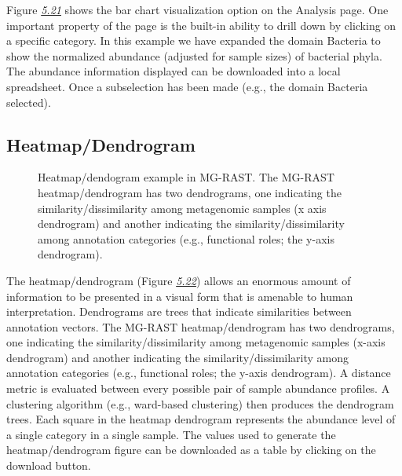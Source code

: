\documentclass[letterpaper,10pt,english]{sphinxmanual}
\begin{document}
Figure {\hyperref[\detokenize{user_manual:fig:analysis-page-bar-chart}]{\emph{5.21}}} shows the bar chart
visualization option on the Analysis page. One important property of the
page is the built-in ability to drill down by clicking on a specific
category. In this example we have expanded the domain Bacteria to show
the normalized abundance (adjusted for sample sizes) of bacterial phyla.
The abundance information displayed can be downloaded into a local
spreadsheet. Once a subselection has been made (e.g., the domain
Bacteria selected).


\subsection{Heatmap/Dendrogram}
\label{\detokenize{user_manual:heatmap-dendrogram}}
\begin{figure}[htbp]
\centering
\capstart

\noindent{}
\caption{Heatmap/dendogram example in MG-RAST. The MG-RAST heatmap/dendrogram
has two dendrograms, one indicating the similarity/dissimilarity
among metagenomic samples (x axis dendrogram) and another indicating
the similarity/dissimilarity among annotation categories (e.g.,
functional roles; the y-axis dendrogram).}\label{\detokenize{user_manual:fig-heatmap}}\end{figure}

The heatmap/dendrogram (Figure {\hyperref[\detokenize{user_manual:fig:heatmap}]{\emph{5.22}}}) allows an
enormous amount of information to be presented in a visual form that is
amenable to human interpretation. Dendrograms are trees that indicate
similarities between annotation vectors. The MG-RAST heatmap/dendrogram
has two dendrograms, one indicating the similarity/dissimilarity among
metagenomic samples (x-axis dendrogram) and another indicating the
similarity/dissimilarity among annotation categories (e.g., functional
roles; the y-axis dendrogram). A distance metric is evaluated between
every possible pair of sample abundance profiles. A clustering algorithm
(e.g., ward-based clustering) then produces the dendrogram trees. Each
square in the heatmap dendrogram represents the abundance level of a
single category in a single sample. The values used to generate the
heatmap/dendrogram figure can be downloaded as a table by clicking on
the download button.
\end{document}
